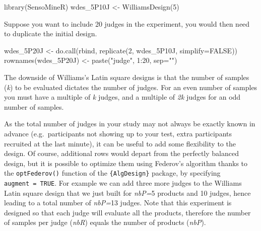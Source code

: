 \documentclass[
]{book}
\newenvironment{Shaded}{\begin{snugshade}}{\end{snugshade}}
\newcommand{\AttributeTok}[1]{\textcolor[rgb]{0.77,0.63,0.00}{#1}}
\newcommand{\ConstantTok}[1]{\textcolor[rgb]{0.00,0.00,0.00}{#1}}
\newcommand{\DecValTok}[1]{\textcolor[rgb]{0.00,0.00,0.81}{#1}}
\newcommand{\FunctionTok}[1]{\textcolor[rgb]{0.00,0.00,0.00}{#1}}
\newcommand{\NormalTok}[1]{#1}
\newcommand{\OtherTok}[1]{\textcolor[rgb]{0.56,0.35,0.01}{#1}}
\newcommand{\SpecialCharTok}[1]{\textcolor[rgb]{0.00,0.00,0.00}{#1}}
\newcommand{\StringTok}[1]{\textcolor[rgb]{0.31,0.60,0.02}{#1}}
\begin{document}
\begin{Shaded}
\begin{Highlighting}[]
\FunctionTok{library}\NormalTok{(SensoMineR)}
\NormalTok{wdes\_5P10J }\OtherTok{\textless{}{-}} \FunctionTok{WilliamsDesign}\NormalTok{(}\DecValTok{5}\NormalTok{)}
\end{Highlighting}
\end{Shaded}

Suppose you want to include 20 judges in the experiment, you would then need to duplicate the initial design.

\begin{Shaded}
\begin{Highlighting}[]
\NormalTok{wdes\_5P20J }\OtherTok{\textless{}{-}} \FunctionTok{do.call}\NormalTok{(rbind, }\FunctionTok{replicate}\NormalTok{(}\DecValTok{2}\NormalTok{, wdes\_5P10J, }\AttributeTok{simplify=}\ConstantTok{FALSE}\NormalTok{))}
\FunctionTok{rownames}\NormalTok{(wdes\_5P20J) }\OtherTok{\textless{}{-}} \FunctionTok{paste}\NormalTok{(}\StringTok{"judge"}\NormalTok{, }\DecValTok{1}\SpecialCharTok{:}\DecValTok{20}\NormalTok{, }\AttributeTok{sep=}\StringTok{""}\NormalTok{)}
\end{Highlighting}
\end{Shaded}

The downside of Williams's Latin square designs is that the number of samples (\emph{k}) to be evaluated dictates the number of judges. For an even number of samples you must have a multiple of \emph{k} judges, and a multiple of \emph{2k} judges for an odd number of samples.

As the total number of judges in your study may not always be exactly known in advance (e.g.~participants not showing up to your test, extra participants recruited at the last minute), it can be useful to add some flexibility to the design. Of course, additional rows would depart from the perfectly balanced design, but it is possible to optimize them using Federov's algorithm thanks to the \texttt{optFederov()} function of the \texttt{\{AlgDesign\}} package, by specifying \texttt{augment\ =\ TRUE}. For example we can add three more judges to the Williams Latin square design that we just built for \emph{nbP=}5 products and 10 judges, hence leading to a total number of \emph{nbP=}13 judges. Note that this experiment is designed so that each judge will evaluate all the products, therefore the number of samples per judge (\emph{nbR}) equals the number of products (\emph{nbP}).
\end{document}
